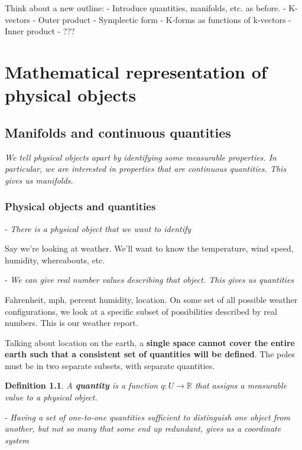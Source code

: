 \documentclass{book}
\newtheorem{defn}[equation]{Definition}
\begin{document}
\tableofcontents


Think about a new outline: 
- Introduce quantities, manifolds, etc. as before. 
- K-vectors
- Outer product
- Symplectic form
- K-forms as functions of k-vectors
- Inner product
- ???


\chapter{Mathematical representation of physical objects}



\section{Manifolds and continuous quantities}
\emph{We tell physical objects apart by identifying some measurable properties. In particular, we are interested in properties that are continuous quantities. This gives us manifolds.}

\subsection{Physical objects and quantities}

- \emph{There is a physical object that we want to identify}

Say we're looking at weather. We'll want to know the temperature, wind speed, humidity, whereabouts, etc.

- \emph{We can give real number values describing that object. This gives us quantities}

Fahrenheit, mph, percent humidity, location.
On some set of all possible weather configurations, we look at a specific subset of possibilities described by real numbers. This is our weather report.  

Talking about location on the earth, a \textbf{single space cannot cover the entire earth such that a consistent set of quantities will be defined}. The poles must be in two separate subsets, with separate quantities. 

\begin{defn}
	A \textbf{quantity} is a function $q : U \to \mathbb{R}$ that assigns a measurable value to a physical object.
\end{defn}


- \emph{Having a set of one-to-one quantities sufficient to distinguish one object from another, but not so many that some end up redundant, gives us a coordinate system}
\end{document}

